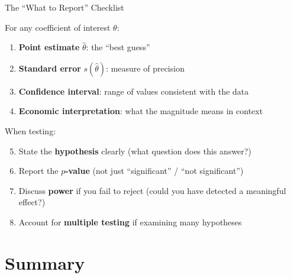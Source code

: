 \documentclass[handout, aspectratio=169]{beamer}
\numberwithin{equation}{section}
\begin{document}
\begin{frame}{The ``What to Report'' Checklist}

For any coefficient of interest $\theta$:

\smallskip

\begin{enumerate}
\item \textbf{Point estimate} $\hat{\theta}$: the ``best guess''
\item \textbf{Standard error} $s(\hat{\theta})$: measure of precision
\item \textbf{Confidence interval}: range of values consistent with the data
\item \textbf{Economic interpretation}: what the magnitude means in context
\end{enumerate}

\pause
\smallskip

When testing:
\begin{enumerate}
\setcounter{enumi}{4}
\item State the \textbf{hypothesis} clearly (what question does this answer?)
\item Report the \textbf{$p$-value} (not just ``significant'' / ``not significant'')
\item Discuss \textbf{power} if you fail to reject (could you have detected a meaningful effect?)
\item Account for \textbf{multiple testing} if examining many hypotheses
\end{enumerate}
\end{frame}

\section{Summary}
\setcounter{subsection}{1}
\end{document}
